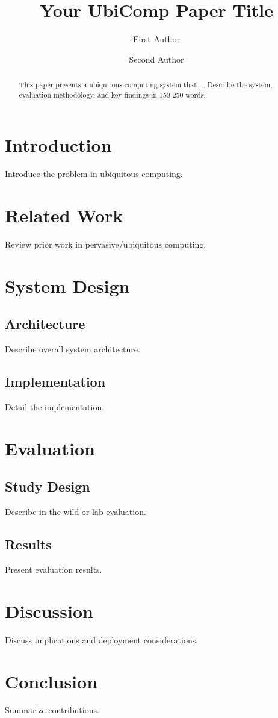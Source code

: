 \documentclass[sigconf,review]{acmart}
\begin{document}
\title{Your UbiComp Paper Title}

\author{First Author}

\author{Second Author}

\begin{abstract}
This paper presents a ubiquitous computing system that ... Describe the system, evaluation methodology, and key findings in 150-250 words.
\end{abstract}


\maketitle

\section{Introduction}
Introduce the problem in ubiquitous computing.

\section{Related Work}
Review prior work in pervasive/ubiquitous computing.

\section{System Design}
\subsection{Architecture}
Describe overall system architecture.

\subsection{Implementation}
Detail the implementation.

\section{Evaluation}
\subsection{Study Design}
Describe in-the-wild or lab evaluation.

\subsection{Results}
Present evaluation results.

\section{Discussion}
Discuss implications and deployment considerations.

\section{Conclusion}
Summarize contributions.



\end{document}
